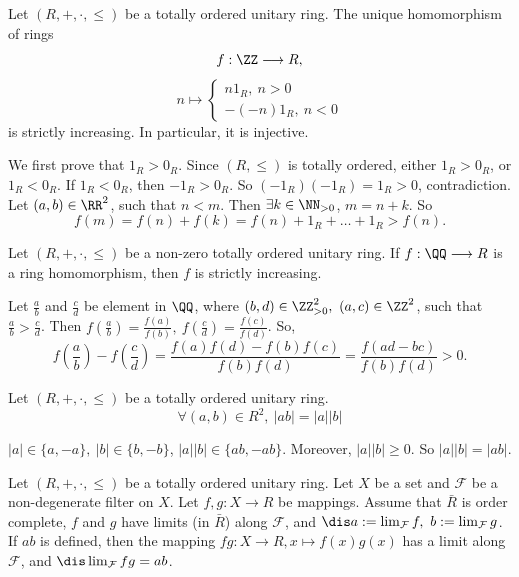\begin{propositionenv}
    Let $(R,+,\cdot,\le)$ be a totally ordered unitary ring. The unique homomorphism of rings
    $$f:\ZZ\longrightarrow R,$$
    $$n\longmapsto \begin{cases} n 1_R,\ n>0\\ -(-n)1_R,\ n<0\end{cases}$$
    is strictly increasing. In particular, it is injective.
\end{propositionenv}
\begin{proofenv}
    We first prove that $1_R>0_R$. Since $(R,\le )$ is totally ordered, either $1_R>0_R$, or $1_R<0_R$. If $1_R<0_R$, then $-1_R>0_R$. So $(-1_R)(-1_R)=1_R>0$, contradiction. Let $(a,b)\in \RR^2$, such that $n<m$. Then $\exists k\in \NN_{>0}$, $m=n+k$. So 
    $$f(m)=f(n)+f(k)=f(n)+1_R+\dots+1_R>f(n).$$
\end{proofenv}
\begin{propositionenv}
    Let $(R,+,\cdot,\le)$ be a non-zero totally ordered unitary ring. If $f:\QQ\longrightarrow R$ is a ring homomorphism, then $f$ is strictly increasing.
\end{propositionenv}
\begin{proofenv}
    Let $\frac{a}{b}$ and $\frac{c}{d}$ be element in $\QQ$, where $(b,d)\in \ZZ_{>0}^2,\  (a,c)\in \ZZ^2$, such that $\frac{a}{b}>\frac{c}{d}$. Then $f\left(\frac{a}{b}\right)=\frac{f(a)}{f(b)},\ f\left(\frac{c}{d}\right)=\frac{f(c)}{f(d)}$. So,
    $$f\left(\frac{a}{b}\right)-f\left(\frac{c}{d}\right)=\frac{f(a)f(d)-f(b)f(c)}{f(b)f(d)}=\frac{f(ad-bc)}{f(b)f(d)}>0.$$
\end{proofenv}
\begin{propositionenv}
    Let $(R,+,\cdot,\le)$ be a totally ordered unitary ring. 
    $$\forall (a,b)\in R^2,\ \left|ab\right|=\left|a\right|\left| b\right|$$
\end{propositionenv}
\begin{proofenv}
    $|a|\in \{a,-a\},\ |b|\in \{b,-b\}$, $|a||b|\in\{ab,-ab\}$. Moreover, $|a||b|\ge 0$. So $|a||b| = |ab|$.
\end{proofenv}
\begin{theoremenv}
    Let $(R,+,\cdot,\le)$ be a totally ordered unitary ring. 
    Let $X$ be a set and $\mathcal{F}$ be a non-degenerate filter on $X$. Let $f,g:X\longrightarrow R$ be mappings. Assume that $\bar{R}$ is order complete, $f$ and $g$ have limits (in $\bar{R}$) along $\mathcal{F}$, and $\dis a:=\lim_{\mathcal{F}}f,\ b:=\lim_{\mathcal{F}}g$. If $ab$ is defined, then the mapping $fg: X\longrightarrow R, x\longmapsto f(x)g(x)$ has a limit along $\mathcal{F}$, and $\dis \lim_{\mathcal{F}}fg=ab$.
\end{theoremenv}
